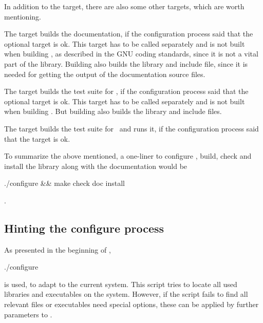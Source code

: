 In addition to the  target, there are also some other targets, which are worth mentioning.

The target  builds the documentation, if the configuration process said that the optional target  is ok. This target has to be called separately and is not built when building , as described in the GNU coding standards, since it is not a vital part of the library. Building  also builds the library and include file, since it is needed for getting the output of the documentation source files.

The target  builds the test suite for \projectname, if the configuration process said that the optional target  is ok. This target has to be called separately and is not built when building . But building  also builds the library and include files.

The target  builds the test suite for \projectname~and runs it, if the configuration process said that the target  is ok.

To summarize the above mentioned, a one-liner to configure \projectname, build, check and install the library along with the documentation would be
\begin{console}
./configure && make check doc install
\end{console}
.


\subsection{Hinting the configure process}

As presented in the beginning of , 
\begin{console}
./configure
\end{console}
is used, to adapt \projectname to the current system. This script tries to locate all used libraries and executables on the system. However, if the  script fails to find all relevant files or executables need special options, these can be applied by further parameters to .

